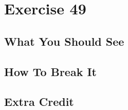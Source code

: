 \chapter{Exercise 49}


\section{What You Should See}


\section{How To Break It}


\section{Extra Credit}



